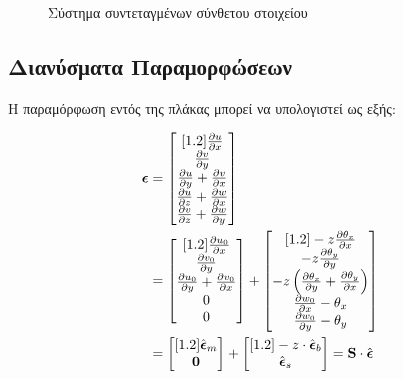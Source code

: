 \begin{figure}[H]
  \centering
  
  \caption{Σύστημα συντεταγμένων σύνθετου στοιχείου}
  \label{fig:Composite element coordinate system}
\end{figure}



\subsection{Διανύσματα Παραμορφώσεων} \label{strain-vectors}

Η παραμόρφωση εντός της πλάκας μπορεί να υπολογιστεί ως εξής:

\begin{align}
    \label{eq:strain}
  \boldsymbol{\epsilon} &= 
  \begin{bmatrix}[1.2]
  \frac{\partial u}{\partial x} \\
  \frac{\partial v}{\partial y} \\
  \frac{\partial u}{\partial y} + \frac{\partial v}{\partial x} \\
  \frac{\partial u}{\partial z} + \frac{\partial w}{\partial x} \\
  \frac{\partial v}{\partial z} + \frac{\partial w}{\partial y}
  \end{bmatrix}
  \notag \\&=
  \begin{bmatrix}[1.2]
  \frac{\partial u_{0}}{\partial x} \\
  \frac{\partial v_{0}}{\partial y} \\
  \frac{\partial u_{0}}{\partial y} + \frac{\partial v_{0}}{\partial x} \\
  0 \\
  0
  \end{bmatrix}
  +
  \begin{bmatrix}[1.2]
  - z\frac{\partial\theta_{x}}{\partial x} \\
  - z\frac{\partial\theta_{y}}{\partial y} \\
  - z\left( \frac{\partial\theta_{x}}{\partial y} + \frac{\partial\theta_{y}}{\partial x} \right) \\
  \frac{\partial w_{0}}{\partial x} - \theta_{x} \\
  \frac{\partial w_{0}}{\partial y} - \theta_{y}
  \end{bmatrix}
  \notag \\&= 
  \begin{bmatrix}[1.2]
  \hat{\boldsymbol{\epsilon}}_{m} \\
  \mathbf{0}
  \end{bmatrix}
  +
  \begin{bmatrix}[1.2]
  - z \cdot \hat{\boldsymbol{\epsilon}}_{b} \\
  \hat{\boldsymbol{\epsilon}}_{s}
  \end{bmatrix}
  =
  \mathbf{S} \cdot \hat{\boldsymbol{\epsilon}}
\end{align}
  

